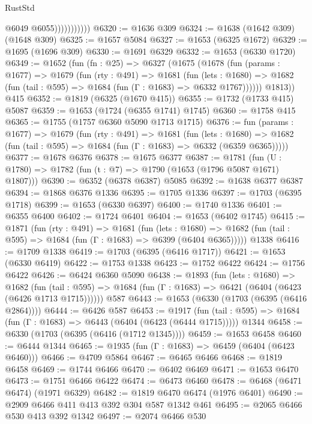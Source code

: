 \begin{lexlean}{RustStd}
\begin{coremodule}
                          @6049
                          @6055)))))))))))
@6320 := @1636 @309
@6324 := @1638 (@1642 @309) (@1648 @309)
@6325 := @1657 @5084
@6327 := @1653 (@6325 @1672)
@6329 := @1695 (@1696 @309)
@6330 := @1691 @6329
@6332 := @1653 (@6330 @1720)
@6349 := @1652
    (fun (fn : @25) =>
    @6327
      (@1675
        (@1678
          (fun (params : @1677) =>
          @1679
            (fun (rty : @491) =>
            @1681
              (fun (lets : @1680) =>
              @1682 (fun (tail : @595) => @1684 (fun (Γ : @1683) => @6332 @1767))))))
        @1813))
    @415
@6352 := @1819 (@6325 (@1670 @415))
@6355 := @1732 (@1733 @415) @5087
@6359 := @1653 (@1724 (@6355 @1741) @1745)
@6360 := @1758 @415
@6365 := @1755 (@1757 @6360 @5090 @1713 @1715)
@6376 := fun (params : @1677) =>
  @1679
    (fun (rty : @491) =>
    @1681
      (fun (lets : @1680) =>
      @1682 (fun (tail : @595) => @1684 (fun (Γ : @1683) => @6332 (@6359 @6365)))))
@6377 := @1678 @6376
@6378 := @1675 @6377
@6387 := @1781 (fun (U : @1780) => @1782 (fun (t : @7) => @1790 (@1653 (@1796 @5087 @1671) @1807)))
@6390 := @6352 (@6378 @6387) @5085
@6392 := @1638 @6377 @6387
@6394 := @1868 @6376 @1336
@6395 := @1705 @1336
@6397 := @1703 (@6395 @1718)
@6399 := @1653 (@6330 @6397)
@6400 := @1740 @1336
@6401 := @6355 @6400
@6402 := @1724 @6401
@6404 := @1653 (@6402 @1745)
@6415 := @1871
    (fun (rty : @491) =>
    @1681
      (fun (lets : @1680) =>
      @1682 (fun (tail : @595) => @1684 (fun (Γ : @1683) => @6399 (@6404 @6365)))))
    @1338
@6416 := @1709 @1338
@6419 := @1703 (@6395 (@6416 @1717))
@6421 := @1653 (@6330 @6419)
@6422 := @1753 @1338
@6423 := @1752 @6422
@6424 := @1756 @6422
@6426 := @6424 @6360 @5090
@6438 := @1893
    (fun (lets : @1680) =>
    @1682
      (fun (tail : @595) => @1684 (fun (Γ : @1683) => @6421 (@6404 (@6423 (@6426 @1713 @1715))))))
    @587
@6443 := @1653 (@6330 (@1703 (@6395 (@6416 @2864))))
@6444 := @6426 @587
@6453 := @1917
    (fun (tail : @595) => @1684 (fun (Γ : @1683) => @6443 (@6404 (@6423 (@6444 @1715)))))
    @1344
@6458 := @6330 (@1703 (@6395 (@6416 (@1712 @1345))))
@6459 := @1653 @6458
@6460 := @6444 @1344
@6465 := @1935 (fun (Γ : @1683) => @6459 (@6404 (@6423 @6460)))
@6466 := @4709 @5864
@6467 := @6465 @6466
@6468 := @1819 @6458
@6469 := @1744 @6466
@6470 := @6402 @6469
@6471 := @1653 @6470
@6473 := @1751 @6466 @6422
@6474 := @6473 @6460
@6478 := @6468 (@6471 @6474) (@1971 @6329)
@6482 := @1819 @6470 @6474 (@1976 @6401)
@6490 := @2909 @6466 @411 @413 @392 @304 @587 @1342 @461
@6495 := @2065 @6466 @530 @413 @392 @1342
@6497 := @2074 @6466 @530

\end{coremodule}
\end{lexlean}
